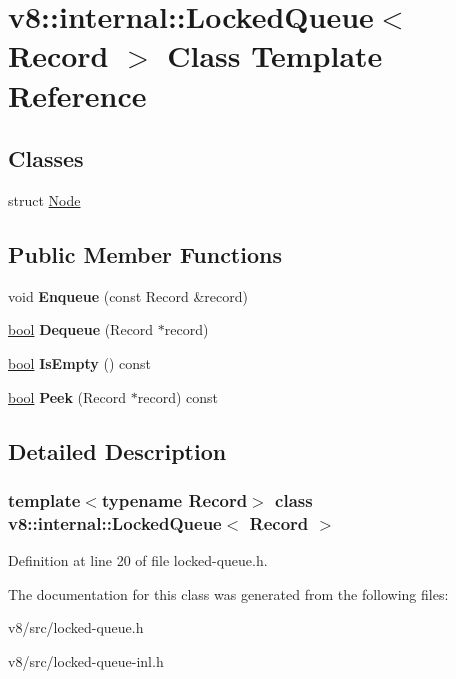 \hypertarget{classv8_1_1internal_1_1LockedQueue}{}\section{v8\+:\+:internal\+:\+:Locked\+Queue$<$ Record $>$ Class Template Reference}
\label{classv8_1_1internal_1_1LockedQueue}
\subsection*{Classes}
\begin{DoxyCompactItemize}
\item 
struct \mbox{\hyperlink{structv8_1_1internal_1_1LockedQueue_1_1Node}{Node}}
\end{DoxyCompactItemize}
\subsection*{Public Member Functions}
\begin{DoxyCompactItemize}
\item 
\mbox{\label{classv8_1_1internal_1_1LockedQueue_ae84cdf3d832dd96524a80c38ce677e0b}} 
void {\bfseries Enqueue} (const Record \&record)
\item 
\mbox{\label{classv8_1_1internal_1_1LockedQueue_ae6c09b04aaaa97edd1c743065ab1c8db}} 
\mbox{\hyperlink{classbool}{bool}} {\bfseries Dequeue} (Record $\ast$record)
\item 
\mbox{\label{classv8_1_1internal_1_1LockedQueue_a293a3d9c48d547c0f3a270c1210d0d1f}} 
\mbox{\hyperlink{classbool}{bool}} {\bfseries Is\+Empty} () const
\item 
\mbox{\label{classv8_1_1internal_1_1LockedQueue_a88a227e15b63310e0bff762e3798a7fc}} 
\mbox{\hyperlink{classbool}{bool}} {\bfseries Peek} (Record $\ast$record) const
\end{DoxyCompactItemize}


\subsection{Detailed Description}
\subsubsection*{template$<$typename Record$>$\newline
class v8\+::internal\+::\+Locked\+Queue$<$ Record $>$}



Definition at line 20 of file locked-\/queue.\+h.



The documentation for this class was generated from the following files\+:\begin{DoxyCompactItemize}
\item 
v8/src/locked-\/queue.\+h\item 
v8/src/locked-\/queue-\/inl.\+h\end{DoxyCompactItemize}
